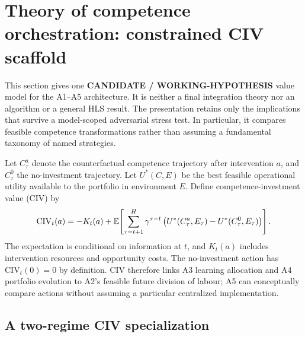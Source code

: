 \section{Theory of competence orchestration: constrained CIV scaffold}

This section gives one \textbf{CANDIDATE / WORKING-HYPOTHESIS} value model for the A1--A5 architecture. It is neither a final integration theory nor an algorithm or a general HLS result. The presentation retains only the implications that survive a model-scoped adversarial stress test. In particular, it compares feasible competence transformations rather than assuming a fundamental taxonomy of named strategies.

Let $C_\tau^a$ denote the counterfactual competence trajectory after intervention $a$, and $C_\tau^0$ the no-investment trajectory. Let $U^*(C,E)$ be the best feasible operational utility available to the portfolio in environment $E$. Define competence-investment value (CIV) by
\begin{equation}
\mathrm{CIV}_t(a)=-K_t(a)+\mathbb{E}\!\left[\sum_{\tau=t+1}^{H}\gamma^{\tau-t}\left(U^*(C_\tau^a,E_\tau)-U^*(C_\tau^0,E_\tau)\right)\right].
\label{eq:civ-general}
\end{equation}
The expectation is conditional on information at $t$, and $K_t(a)$ includes intervention resources and opportunity costs. The no-investment action has $\mathrm{CIV}_t(0)=0$ by definition. CIV therefore links A3 learning allocation and A4 portfolio evolution to A2's feasible future division of labour; A5 can conceptually compare actions without assuming a particular centralized implementation.

\subsection{A two-regime CIV specialization}

